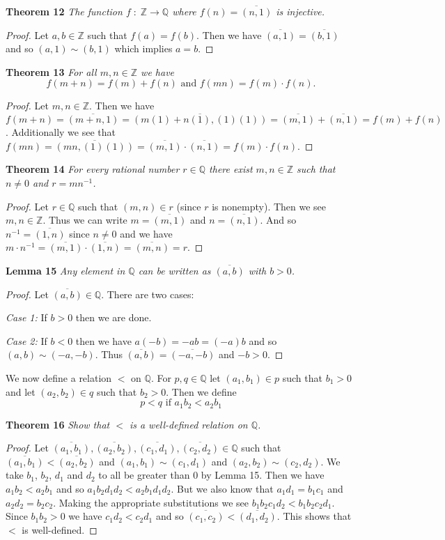 \documentclass{article}
\begin{document}
\begin{flushleft}
\textbf{Theorem 12}
\textsl{The function $f\; : \; \mathbb{Z} \rightarrow \mathbb{Q}$ where $f(n)=\overline{(n,1)}$ is injective.}
\begin{proof}
Let $a,b \in \mathbb{Z}$ such that $f(a)=f(b)$. Then we have $\overline{(a,1)}=\overline{(b,1)}$ and so $(a,1) \sim (b,1)$ which implies $a=b$.
\end{proof}

\textbf{Theorem 13}
\textsl{For all $m,n \in \mathbb{Z}$ we have
\[
f(m+n)=f(m)+f(n) \text{ and } f(mn)=f(m) \cdot f(n).
\]}
\begin{proof}
Let $m,n \in \mathbb{Z}$. Then we have $f(m+n)=\overline{(m+n,1)}=\overline{(m(1)+n(1),(1)(1))}=\overline{(m,1)}+\overline{(n,1)}=f(m)+f(n)$. Additionally we see that $f(mn)=\overline{(mn,(1)(1))}=\overline{(m,1)} \cdot \overline{(n,1)}=f(m) \cdot f(n)$.
\end{proof}

\textbf{Theorem 14}
\textsl{For every rational number $r \in \mathbb{Q}$ there exist $m,n \in \mathbb{Z}$ such that $n \neq 0$ and $r=mn^{-1}$.}
\begin{proof}
Let $r \in \mathbb{Q}$ such that $(m,n) \in r$ (since $r$ is nonempty). Then we see $m,n \in \mathbb{Z}$. Thus we can write $m=\overline{(m,1)}$ and $n=\overline{(n,1)}$. And so $n^{-1}=\overline{(1,n)}$ since $n \neq 0$ and we have $m \cdot n^{-1} = \overline{(m,1)} \cdot \overline{(1,n)} = \overline{(m,n)} = r$.
\end{proof}

\textbf{Lemma 15}
\textsl{Any element in $\mathbb{Q}$ can be written as $\overline{(a,b)}$ with $b>0$.}
\begin{proof}
Let $\overline{(a,b)} \in \mathbb{Q}$. There are two cases:\newline

\textsl{Case 1:} If $b>0$ then we are done.\newline

\textsl{Case 2:} If $b<0$ then we have $a(-b)=-ab=(-a)b$ and so $(a,b) \sim (-a,-b)$. Thus $\overline{(a,b)} = \overline{(-a,-b)}$ and $-b>0$.
\end{proof}

We now define a relation $<$ on $\mathbb{Q}$. For $p,q \in \mathbb{Q}$ let $(a_1,b_1) \in p$ such that $b_1>0$ and let $(a_2,b_2) \in q$ such that $b_2>0$. Then we define
\[
p<q \text{ if } a_1b_2<a_2b_1
\]

\textbf{Theorem 16}
\textsl{Show that $<$ is a well-defined relation on $\mathbb{Q}$.}
\begin{proof}
Let $\overline{(a_1,b_1)},\overline{(a_2,b_2)},\overline{(c_1,d_1)},\overline{(c_2,d_2)} \in \mathbb{Q}$ such that $\overline{(a_1,b_1)} < \overline{(a_2,b_2)}$ and $(a_1,b_1) \sim (c_1,d_1)$ and $(a_2,b_2) \sim (c_2,d_2)$. We take $b_1$, $b_2$, $d_1$ and $d_2$ to all be greater than $0$ by Lemma 15. Then we have $a_1b_2 < a_2b_1$ and so $a_1b_2d_1d_2 < a_2b_1d_1d_2$. But we also know that $a_1d_1=b_1c_1$ and $a_2d_2=b_2c_2$. Making the appropriate substitutions we see $b_1b_2c_1d_2 < b_1b_2c_2d_1$. Since $b_1b_2>0$ we have $c_1d_2<c_2d_1$ and so $\overline{(c_1,c_2)} < \overline{(d_1,d_2)}$. This shows that $<$ is well-defined.
\end{proof}


\end{flushleft}
\end{document}
